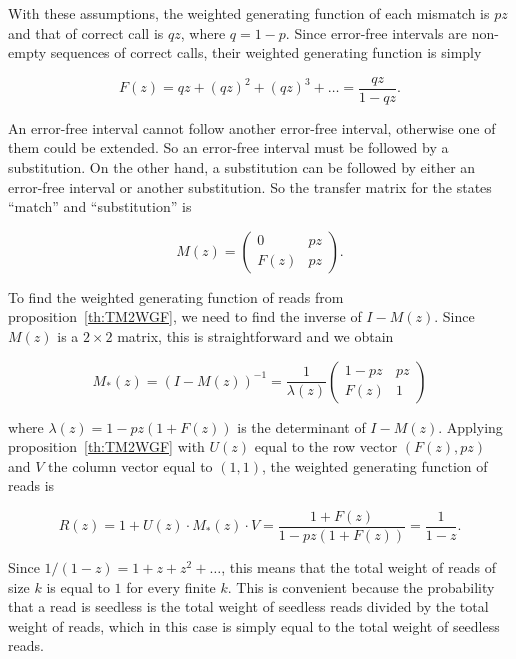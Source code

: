 \documentclass{article}
\begin{document}
With these assumptions, the weighted generating function of each mismatch
is $pz$ and that of correct call is $qz$, where $q=1-p$. Since error-free
intervals are non-empty sequences of correct calls, their weighted
generating function is simply

\begin{equation}
\label{eq:Fsub}
F(z) = qz + (qz)^2 + (qz)^3 + \ldots = \frac{qz}{1-qz}.
\end{equation}

An error-free interval cannot follow another error-free interval,
otherwise one of them could be extended. So an error-free interval must be
followed by a substitution. On the other hand, a substitution can be
followed by either an error-free interval or another substitution. So the
transfer matrix for the states ``match'' and ``substitution'' is

\begin{equation*}
M(z) = \left(
\begin{matrix}
0    & pz \\
F(z) & pz
\end{matrix}
\right).
\end{equation*}

To find the weighted generating function of reads from
proposition~\ref{th:TM2WGF}, we need to find the inverse of $I-M(z)$.
Since $M(z)$ is a $2 \times 2$ matrix, this is straightforward and we
obtain

\begin{equation*}
M_*(z) = (I-M(z))^{-1}=
\frac{1}{\lambda(z)}
\left(
\begin{matrix}
1-pz & pz   \\
F(z) & 1
\end{matrix}
\right)
\end{equation*}

\noindent
where $\lambda(z) = 1-pz(1+F(z))$ is the determinant of $I-M(z)$. Applying
proposition~\ref{th:TM2WGF} with $U(z)$ equal to the row vector $(F(z),
pz)$ and $V$ the column vector equal to $(1,1)$, the weighted generating
function of reads is

\begin{equation}
\label{eq:Rsub}
R(z) = 1 + U(z) \cdot M_*(z) \cdot V = 
\frac{1+F(z)}{1-pz(1+F(z))} = \frac{1}{1-z}.
\end{equation}

Since $1/(1-z) = 1+z+z^2 + \ldots$, this means that the total weight of
reads of size $k$ is equal to $1$ for every finite $k$. This is convenient
because the probability that a read is seedless is the total weight of
seedless reads divided by the total weight of reads, which in this case is
simply equal to the total weight of seedless reads.
\end{document}
